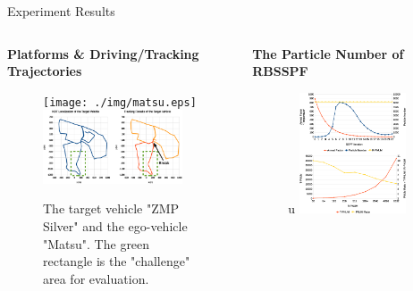 \documentclass[final,hyperref={pdfpagelabels=false}]{beamer}
\begin{document}
\begin{frame}[t]
\begin{columns}[t]
\begin{column}{.48\textwidth}
\begin{block}{Experiment Results}
\vspace{-2em}
\begin{columns}[t]
	\begin{column}{0.48\textwidth}
		\begin{center}
			\textbf{Platforms \& Driving/Tracking Trajectories}
		\end{center}
		\begin{figure}
		 \centering
		 \texttt{[image: ./img/matsu.eps]}\\
		 \vspace{1em}
		 \includegraphics[width=0.9\textwidth]{./img/path.eps}
		 \caption{The target vehicle "ZMP Silver" and the ego-vehicle "Matsu". The green rectangle is the "challenge" area for evaluation. \label{fig:matsu}}
		\end{figure}
	\end{column}
	\begin{column}{0.48\textwidth}
		\begin{center}
			\textbf{The Particle Number of RBSSPF}
		\end{center}
		\begin{figure}u
		 \centering
		 \includegraphics[width=0.8\textwidth]{./img/SSPF-Iteration}

\end{figure}
\end{column}
\end{columns}
\end{block}
\end{column}
\end{columns}
\end{frame}
\end{document}
